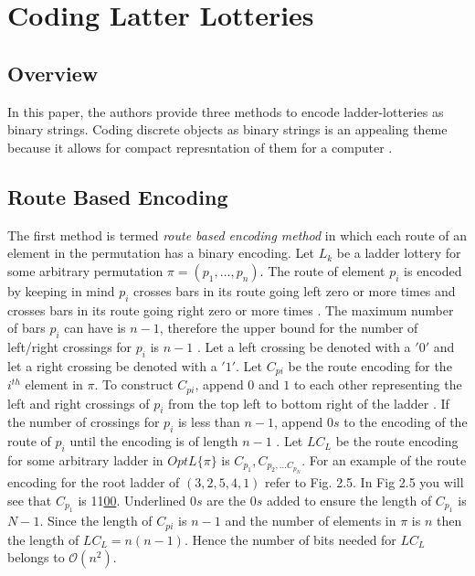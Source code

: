 \section{Coding Latter Lotteries}
\subsection{Overview}
In this paper, the authors provide three methods to encode ladder-lotteries as 
binary strings. Coding discrete objects as binary strings is an appealing theme because 
it allows for compact represntation of them for a computer \cite{A5}.
\subsection{Route Based Encoding}
The first method is termed \emph{route based encoding method} in 
which each route of an element in the permutation has a binary encoding. Let $L_{k}$
be a ladder lottery for some arbitrary permutation $\pi=(p_{1},\dots,p_{n})$. The route 
of element $p_{i}$ is encoded by keeping in mind $p_{i}$ crosses bars in its route 
going left zero or more times and crosses bars in its route going right zero or 
more times \cite{A5}. The maximum number of bars $p_{i}$ can have is $n-1$, therefore the 
upper bound for the number of left/right crossings for $p_{i}$ is $n-1$ \cite{A5}. 
Let a left crossing be denoted with a $'0'$ and let a right crossing be denoted 
with a $'1'$. Let $C_{pi}$ be the route encoding for the $i^{th}$ element 
in $\pi$. To construct $C_{pi}$,  append $0$ and $1$ to each other representing 
the left and right crossings of $p_{i}$ from the top left 
to bottom right of the ladder \cite{A5}. If the number of crossings for $p_{i}$ 
is less than $n-1$, append $0s$ to the encoding of the route of $p_{i}$ until
the encoding is of length $n-1$ \cite{A5}. Let $LC_{L}$ be the route encoding for 
some arbitrary ladder in $OptL\{\pi\}$ is $C_{p_{1}}, C_{p_{2}, \dots C_{p_{N}}}$.
For an example of the route encoding for the root ladder of $(3,2,5,4,1)$ refer to 
Fig. 2.5. In Fig 2.5 you will see that $C_{p_{1}}$ is 11\underline{00}. Underlined 
$0s$ are the $0s$ added to ensure the length of $C_{p_{1}}$ is $N-1$.
Since the length of $C_{pi}$ is $n-1$ and the number of elements in $\pi$ is $n$
then the length of $LC_{L}=n(n-1)$. Hence the number of bits needed for $LC_{L}$ 
belongs to $\mathcal{O}(n^{2})$.\par 
